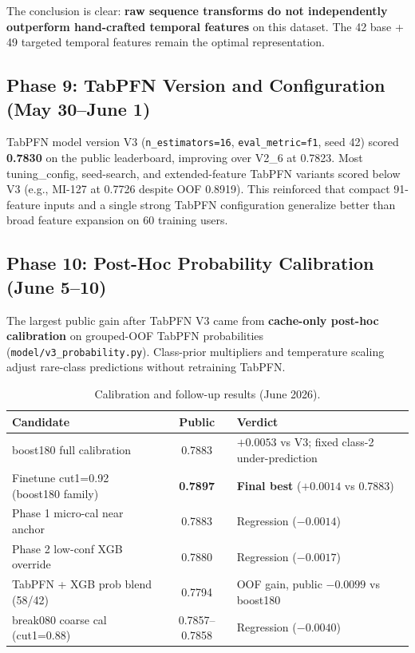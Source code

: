 \documentclass[12pt, a4paper]{article}
\begin{document}
The conclusion is clear: \textbf{raw sequence transforms do not independently outperform hand-crafted temporal features} on this dataset. The 42 base + 49 targeted temporal features remain the optimal representation.

\subsection{Phase 9: TabPFN Version and Configuration (May 30--June 1)}

TabPFN model version V3 (\texttt{n\_estimators=16}, \texttt{eval\_metric=f1}, seed 42) scored \textbf{0.7830} on the public leaderboard, improving over V2\_6 at 0.7823. Most tuning\_config, seed-search, and extended-feature TabPFN variants scored below V3 (e.g., MI-127 at 0.7726 despite OOF 0.8919). This reinforced that compact 91-feature inputs and a single strong TabPFN configuration generalize better than broad feature expansion on 60 training users.

\subsection{Phase 10: Post-Hoc Probability Calibration (June 5--10)}

The largest public gain after TabPFN V3 came from \textbf{cache-only post-hoc calibration} on grouped-OOF TabPFN probabilities (\texttt{model/v3\_probability.py}). Class-prior multipliers and temperature scaling adjust rare-class predictions without retraining TabPFN.

\begin{table}[h]
\centering
\caption{Calibration and follow-up results (June 2026).}
\label{tab:calibration}
\begin{tabularx}{\textwidth}{@{} Y c Y @{}}
\toprule
\textbf{Candidate} & \textbf{Public} & \textbf{Verdict} \\ \midrule
boost180 full calibration & 0.7883 & $+0.0053$ vs V3; fixed class-2 under-prediction \\
Finetune cut1=0.92 (boost180 family) & \textbf{0.7897} & \textbf{Final best} ($+0.0014$ vs 0.7883) \\
Phase 1 micro-cal near anchor & 0.7883 & Regression ($-0.0014$) \\
Phase 2 low-conf XGB override & 0.7880 & Regression ($-0.0017$) \\
TabPFN + XGB prob blend (58/42) & 0.7794 & OOF gain, public $-0.0099$ vs boost180 \\
break080 coarse cal (cut1=0.88) & 0.7857--0.7858 & Regression ($-0.0040$) \\ \bottomrule
\end{tabularx}
\end{table}
\end{document}

